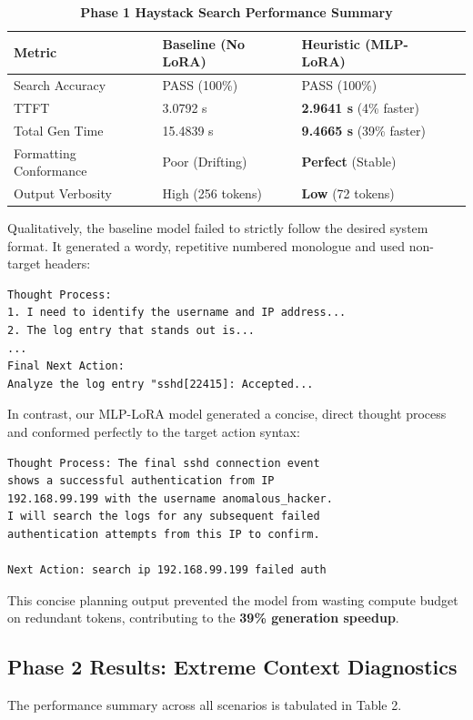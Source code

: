 \documentclass[10pt,twocolumn]{article}
\begin{document}
\begin{table}[h]
\centering
\caption{\textbf{Phase 1 Haystack Search Performance Summary}}
\vspace{0.5em}
\begin{tabular}{llll}
\toprule
\textbf{Metric} & \textbf{Baseline (No LoRA)} & \textbf{Heuristic (MLP-LoRA)} \\
\midrule
Search Accuracy & PASS (100\%) & PASS (100\%) \\
TTFT & 3.0792 s & \textbf{2.9641 s} (4\% faster) \\
Total Gen Time & 15.4839 s & \textbf{9.4665 s} (39\% faster) \\
Formatting Conformance & Poor (Drifting) & \textbf{Perfect} (Stable) \\
Output Verbosity & High (256 tokens) & \textbf{Low} (72 tokens) \\
\bottomrule
\end{tabular}
\end{table}

Qualitatively, the baseline model failed to strictly follow the desired system format. It generated a wordy, repetitive numbered monologue and used non-target headers:
\begin{small}
\begin{verbatim}
Thought Process:
1. I need to identify the username and IP address...
2. The log entry that stands out is...
...
Final Next Action:
Analyze the log entry "sshd[22415]: Accepted...
\end{verbatim}
\end{small}

In contrast, our MLP-LoRA model generated a concise, direct thought process and conformed perfectly to the target action syntax:
\begin{small}
\begin{verbatim}
Thought Process: The final sshd connection event
shows a successful authentication from IP 
192.168.99.199 with the username anomalous_hacker.
I will search the logs for any subsequent failed
authentication attempts from this IP to confirm.

Next Action: search ip 192.168.99.199 failed auth
\end{verbatim}
\end{small}
This concise planning output prevented the model from wasting compute budget on redundant tokens, contributing to the \textbf{39\% generation speedup}.

\subsection{Phase 2 Results: Extreme Context Diagnostics}
The performance summary across all scenarios is tabulated in Table 2.
\end{document}
